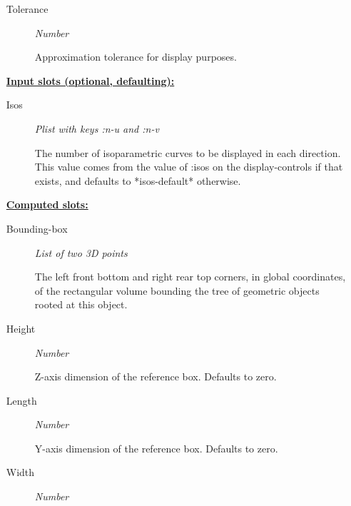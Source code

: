 \documentclass [11pt]{book}
\begin{document}
\begin{itemize}
\begin{description}
\texttt{}



\item [Tolerance]
\emph{Number}

 Approximation tolerance for display purposes.




\end{description}






\textbf{
\underline{Input slots (optional, defaulting):}}

\begin{description}

\item [Isos]
\emph{Plist with keys :n-u and :n-v}

 The number of isoparametric
curves to be displayed in each direction. This value comes from the
value of :isos on the display-controls if that exists, and defaults
to *isos-default* otherwise.




\end{description}






\textbf{
\underline{Computed slots:}}

\begin{description}

\item [Bounding-box]
\emph{List of two 3D points}

 The left front bottom and right rear top corners, in global coordinates,
of the rectangular volume bounding the tree of geometric objects rooted at this object.




\item [Height]
\emph{Number}

 Z-axis dimension of the reference box. Defaults to zero.




\item [Length]
\emph{Number}

 Y-axis dimension of the reference box. Defaults to zero.




\item [Width]
\emph{Number}


\end{description}
\end{itemize}
\end{document}
